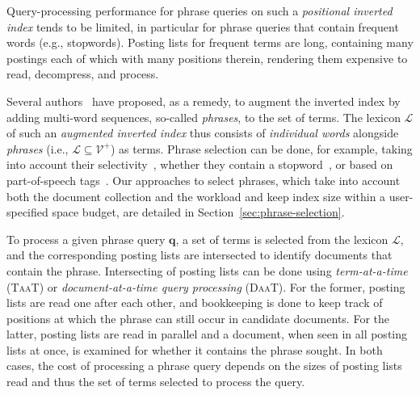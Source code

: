 Query-processing performance for phrase queries on such a
\emph{positional inverted index} tends to be limited, in particular
for phrase queries that contain frequent words (e.g.,
stopwords). Posting lists for frequent terms are long, containing many
postings each of which with many positions therein, rendering them
expensive to read, decompress, and process.

Several authors~\cite{Chang:2008kx,Transier:2008kx,Williams:2004fk}
have proposed, as a remedy, to augment the inverted index by adding
multi-word sequences, so-called \emph{phrases}, to the set of
terms. The lexicon $\mathcal{L}$ of such an \emph{augmented
  inverted index} thus consists of \emph{individual words} alongside
\emph{phrases} (i.e., $\mathcal{L} \subseteq \mathcal{V}^{+}$) as
terms. Phrase selection can be done, for example, taking into account
their selectivity~\cite{Transier:2008kx}, whether they contain a
stopword~\cite{Chang:2008kx,Williams:2004fk}, or based on
part-of-speech tags~\cite{Manning:2008fk}. Our approaches to select
phrases, which take into account both the document collection and the
workload and keep index size within a user-specified space budget, are
detailed in Section~\ref{sec:phrase-selection}.

To process a given phrase query $\mathbf{q}$, a set of terms is
selected from the lexicon $\mathcal{L}$, and the corresponding
posting lists are intersected to identify documents that contain the
phrase. Intersecting of posting lists can be done using
\emph{term-at-a-time} (\textsc{TaaT}) or \emph{document-at-a-time
  query processing} (\textsc{DaaT}). For the former, posting lists are
read one after each other, and bookkeeping is done to keep track of
positions at which the phrase can still occur in candidate
documents. For the latter, posting lists are read in parallel and a
document, when seen in all posting lists at once, is examined for
whether it contains the phrase sought. In both cases, the cost of
processing a phrase query depends on the sizes of posting lists read
and thus the set of terms selected to process the query. 


